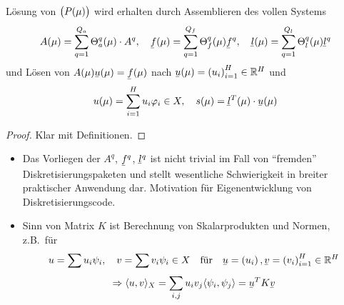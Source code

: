 \begin{kor}
	Lösung von $\big(P(\mu)\big)$ wird erhalten durch Assemblieren des vollen Systems
	\[
		A(\mu) = \sum_{q=1}^{Q_a} \Theta_a^q(\mu) \cdot A^q, \quad \ubar f(\mu) = \sum_{q=1}^{Q_f} \Theta_f^q(\mu) \ubar f^q, \quad \ubar l(\mu) = \sum_{q=1}^{Q_l} \Theta_l^q(\mu) \ubar l^q
	\]
	und Lösen von $A(\mu) \ubar u(\mu) = \ubar f(\mu)$ nach $\ubar u(\mu) = \seq{u_i}_{i=1}^H \in \R^H$ und
	\[
		u(\mu) = \sum_{i=1}^H u_i \phi_i \in X, \quad s(\mu) = \ubar l^T(\mu) \cdot \ubar u(\mu)
	\]

	\begin{proof}
		Klar mit Definitionen.
	\end{proof}
\end{kor}

\begin{bem} \beginwithlistbem
	\begin{itemize}
		\item Das Vorliegen der $A^q$, $\ubar f^q$, $\ubar l^q$ ist nicht trivial im Fall von ``fremden'' Diskretisierungspaketen und stellt wesentliche Schwierigkeit in breiter praktischer Anwendung dar.
			Motivation für Eigenentwicklung von Diskretisierungscode.
		\item Sinn von Matrix $K$ ist Berechnung von Skalarprodukten und Normen, z.B.\ für
			\[
				u = \sum u_i \psi_i, \quad v = \sum v_i \psi_i \in X \quad \text{für} \quad \ubar u = \seq{u_i}, \ubar v = \seq{v_i}_{i=1}^H \in \R^H
			\]
			\[
				\Rightarrow \dotp{u}{v}_X = \sum_{i,j} u_i v_j \dotp{\psi_i}{\psi_j} = \ubar u^T K \ubar v
			\]
	\end{itemize}
\end{bem}
